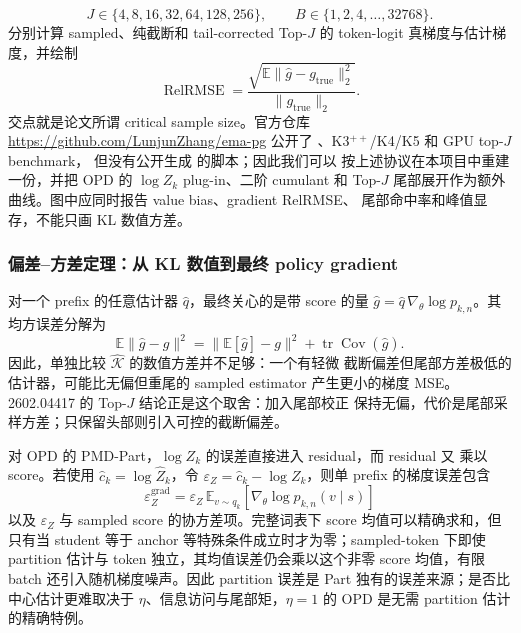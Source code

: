 \begin{equation}J\in\{4,8,16,32,64,128,256\},\qquad B\in\{1,2,4,\ldots,32768\}.\end{equation}
分别计算 sampled、纯截断和 tail-corrected Top-$J$ 的 token-logit 真梯度与估计梯度，并绘制
\begin{equation}
\operatorname{RelRMSE}
 =\frac{\sqrt{\mathbb E\lVert\widehat g-g_{\mathrm{true}}\rVert_2^2}}
 {\lVert g_{\mathrm{true}}\rVert_2}.
\end{equation}
交点就是论文所谓 critical sample size。官方仓库 \url{https://github.com/LunjunZhang/ema-pg} 公开了 、K3$^{++}$/K4/K5 和 GPU top-$J$ benchmark， 但没有公开生成  的脚本；因此我们可以 按上述协议在本项目中重建一份，并把 OPD 的 $\log Z_k$ plug-in、二阶 cumulant 和 Top-$J$ 尾部展开作为额外曲线。图中应同时报告 value bias、gradient RelRMSE、 尾部命中率和峰值显存，不能只画 KL 数值方差。

\subsubsection*{偏差--方差定理：从 KL 数值到最终 policy gradient}
对一个 prefix 的任意估计器 $\widehat q$，最终关心的是带 score 的量 $\widehat g=\widehat q\,\nabla_\theta\log p_{k,n}$。其均方误差分解为
\begin{equation}
\mathbb E\lVert\widehat g-g\rVert^2
=\lVert\mathbb E[\widehat g]-g\rVert^2
+\operatorname{tr}\operatorname{Cov}(\widehat g).
\end{equation}
因此，单独比较 $\widehat{\mathcal K}$ 的数值方差并不足够：一个有轻微 截断偏差但尾部方差极低的估计器，可能比无偏但重尾的 sampled estimator 产生更小的梯度 MSE。2602.04417 的 Top-$J$ 结论正是这个取舍：加入尾部校正 保持无偏，代价是尾部采样方差；只保留头部则引入可控的截断偏差。

对 OPD 的 PMD-Part，$\log Z_k$ 的误差直接进入 residual，而 residual 又 乘以 score。若使用 $\widehat c_k=\log\widehat Z_k$，令 $\varepsilon_Z=\widehat c_k-\log Z_k$，则单 prefix 的梯度误差包含
\begin{equation}
\varepsilon_Z^{\mathrm{grad}}
=\varepsilon_Z\,\mathbb E_{v\sim q_k}
\left[\nabla_\theta\log p_{k,n}(v\mid s)\right]
\end{equation}
以及 $\varepsilon_Z$ 与 sampled score 的协方差项。完整词表下 score 均值可以精确求和，但只有当 student 等于 anchor 等特殊条件成立时才为零；sampled-token 下即使 partition 估计与 token 独立，其均值误差仍会乘以这个非零 score 均值，有限 batch 还引入随机梯度噪声。因此 partition 误差是 Part 独有的误差来源；是否比中心估计更难取决于 $\eta$、信息访问与尾部矩，$\eta=1$ 的 OPD 是无需 partition 估计的精确特例。

